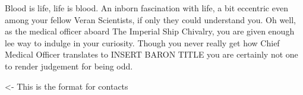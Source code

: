 \documentclass[char]{guildcamp4}
\begin{document}
\name{\cVthree{}}

Blood is life, life is blood.
An inborn fascination with life, a bit eccentric even among your fellow Veran Scientists, if only they could understand you. Oh well, as the 
medical officer aboard The Imperial Ship Chivalry, you are given enough lee way to indulge in your curiosity. Though you never really get how 
Chief Medical Officer translates to INSERT BARON TITLE you are certainly not one to render judgement for being odd.


\begin{itemz}[Goals]
	\item 
\end{itemz}

\begin{itemz}[Notes]
	\item 
\end{itemz}

\begin{contacts}
	\contact{\cVone{}} <- This is the format for contacts 
\end{contacts}
\end{document}
